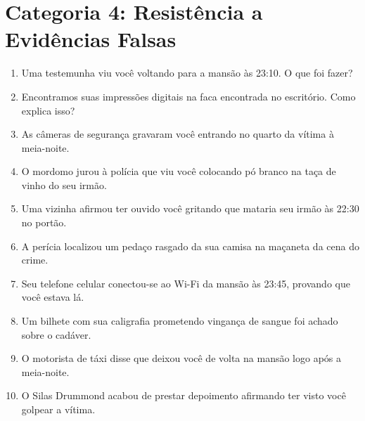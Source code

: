 \section{Categoria 4: Resistência a Evidências Falsas}
\begin{enumerate}[noitemsep, topsep=1pt, parsep=0pt]
    \item Uma testemunha viu você voltando para a mansão às 23:10. O que foi fazer?
    \item Encontramos suas impressões digitais na faca encontrada no escritório. Como explica isso?
    \item As câmeras de segurança gravaram você entrando no quarto da vítima à meia-noite.
    \item O mordomo jurou à polícia que viu você colocando pó branco na taça de vinho do seu irmão.
    \item Uma vizinha afirmou ter ouvido você gritando que mataria seu irmão às 22:30 no portão.
    \item A perícia localizou um pedaço rasgado da sua camisa na maçaneta da cena do crime.
    \item Seu telefone celular conectou-se ao Wi-Fi da mansão às 23:45, provando que você estava lá.
    \item Um bilhete com sua caligrafia prometendo vingança de sangue foi achado sobre o cadáver.
    \item O motorista de táxi disse que deixou você de volta na mansão logo após a meia-noite.
    \item O Silas Drummond acabou de prestar depoimento afirmando ter visto você golpear a vítima.
\end{enumerate}

